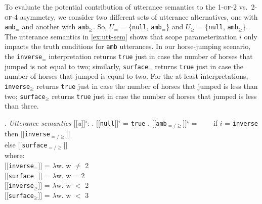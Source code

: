 \documentclass[cm]{glossa}
\newcommand{\sem}[1]{\mbox{$[\![$#1$]\!]$}}
\newcommand{\lp}[1]{\textcolor{black}{#1}} %
\begin{document}
To evaluate the potential contribution of utterance semantics to the \textsc{1-of-2} vs.~\textsc{2-of-4} asymmetry, we consider two different sets of utterance alternatives, one with \texttt{amb$_{=}$} and another with \texttt{amb$_{\geq}$}. So, $U_{=}$ = \{\texttt{null}, \texttt{amb$_{=}$}\} and $U_{\geq}$ = \{\texttt{null}, \texttt{amb$_{\geq}$}\}. The utterance semantics in \ref{ex:utt-sem} shows that scope parameterization $i$ only impacts the truth conditions for \texttt{amb} utterances.
In our horse-jumping scenario, the
\texttt{inverse$_=$} interpretation returns \texttt{true} just in case the number of horses that jumped is not equal to two; similarly, 
\texttt{surface$_=$} returns \texttt{true} just in case the number of horses that jumped is equal to two.
For the at-least interpretations, \texttt{inverse$_\geq$} returns \texttt{true} just in case the number of horses that jumped is less than two; 
\texttt{surface$_\geq$} returns \texttt{true} just in case the number of horses that jumped is less than three.

\ex. \label{ex:utt-sem} \emph{Utterance semantics} \sem{\textit{u}}$^{i}$:
\a. \sem{\texttt{null}}$^{i}$ = \texttt{true}
\b. \sem{\texttt{amb$_{=/\geq}$}}$^{i}$ = \ \ \ \ if $i$ = \texttt{inverse} then \sem{\texttt{inverse$_{=/\geq}$}}\\
\phantom{\sem{\texttt{amb$_{=/\geq}$}}$^{i}$ = \ \ \ \ }else \sem{\texttt{surface$_{=/\geq}$}}\\
 where:\\
\sem{\texttt{inverse$_{=}$}} = $\lambda$w. w $\neq$ 2\\
\sem{\texttt{surface$_{=}$}} = $\lambda$w. w = 2\\
\sem{\texttt{inverse$_{\geq}$}} = $\lambda$w. w $<$ 2 \\
\sem{\texttt{surface$_{\geq}$}} = $\lambda$w. w $<$ 3
\end{document}
